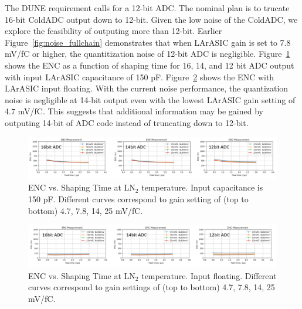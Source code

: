 The DUNE requirement calls for a 12-bit ADC. The nominal plan is to trucate 16-bit ColdADC output down to 
12-bit. Given the low noise of the ColdADC, we explore the feasibility of outputing more than 12-bit.
Earlier Figure~\ref{fig:noise_fullchain} demonstrates that when LArASIC gain is set to 7.8 mV/fC or higher, 
the quantitization noise of 12-bit ADC is negligible. Figure~\ref{fig:noise_quant150pf} 
shows the ENC as a function of shaping time for 16, 14, and 12 bit ADC output with input LArASIC capacitance
of 150 pF. Figure~\ref{fig:noise_quantfloat} shows the ENC with LArASIC input floating. With the 
current noise performance, the quantization noise is negligible at 14-bit output even with the lowest LArASIC gain setting of 4.7 mV/fC.
This suggests that additional information may be gained by outputing 14-bit of ADC code instead of truncating down to 12-bit.
\begin{figure}[h!]
\centering
  \includegraphics[width=1.0\linewidth]{figures/noise_quant150pf.png}
  \caption{ENC vs. Shaping Time at LN$_2$ temperature. Input capacitance is 150 pF. Different curves 
correspond to gain setting of (top to bottom) 4.7, 7.8, 14, 25 mV/fC.}
  \label{fig:noise_quant150pf}
\end{figure}
\begin{figure}[h!]
\centering
  \includegraphics[width=1.0\linewidth]{figures/noise_quantfloat.png}
  \caption{ENC vs. Shaping Time at LN$_2$ temperature. Input floating. Different curves correspond to 
gain settings of (top to bottom) 4.7, 7.8, 14, 25 mV/fC.}
  \label{fig:noise_quantfloat}
\end{figure}



